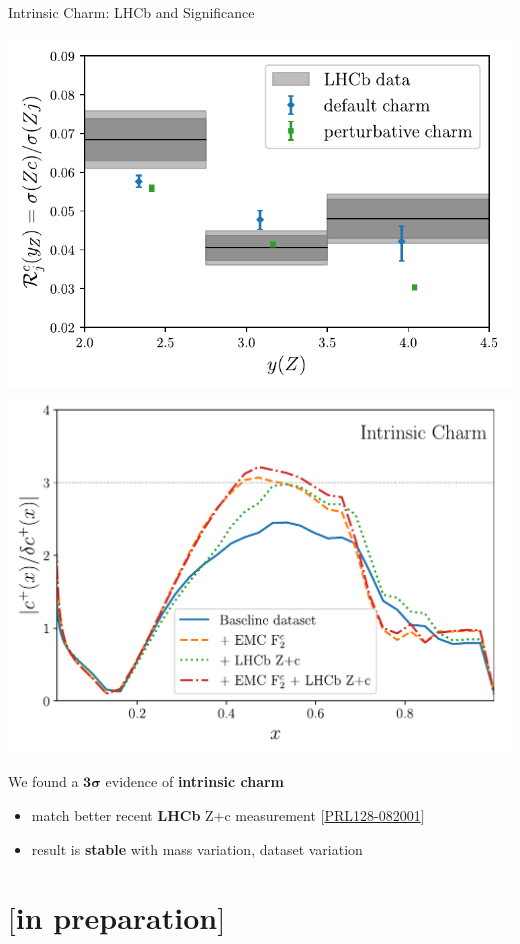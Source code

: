\documentclass[9pt]{beamer}
\providecommand{\iRef}[1]{{\color{mLightGreen}\small $[$#1$]$}}
\begin{document}
\begin{frame}{Intrinsic Charm: LHCb and Significance}
	\begin{center}
		\includegraphics[width=.47\linewidth]{lhcb-zcharm-pheno}%
		\quad%
		\includegraphics[width=.47\linewidth]{pull_baseline_EMC_LHCb_Zc}
	\end{center}

    We found a $\bm{3\sigma}$ evidence of \alert{\textbf{intrinsic charm}}
	\begin{itemize}
		\item match better recent \textbf{LHCb} Z+c measurement \iRef{\href{https://doi.org/10.1103/PhysRevLett.128.082001}{PRL128-082001}}
		\item result is \textbf{stable} with mass variation, dataset variation
	\end{itemize}
\end{frame}


\section{\yadism{} \iRef{in preparation}}
\end{document}
